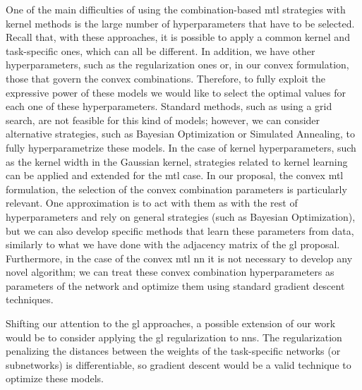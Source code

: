One of the main difficulties of using the combination-based \acrshort{mtl} strategies with kernel methods is the large number of hyperparameters that have to be selected. Recall that, with these approaches, it is possible to apply a common kernel and task-specific ones, which can all be different. In addition, we have other hyperparameters, such as the regularization ones or, in our convex formulation, those that govern the convex combinations. 
%
Therefore, to fully exploit the expressive power of these models we would like to select the optimal values for each one of these hyperparameters. Standard methods, such as using a grid search, are not feasible for this kind of models; however, we can consider alternative strategies, such as Bayesian Optimization or Simulated Annealing, to fully hyperparametrize these models.
In the case of kernel hyperparameters, such as the kernel width in the Gaussian kernel, strategies related to kernel learning can be applied and extended for the \acrshort{mtl} case. 
In our proposal, the convex \acrshort{mtl} formulation, the selection of the convex combination parameters is particularly relevant. One approximation is to act with them as with the rest of hyperparameters and rely on general strategies (such as Bayesian Optimization), but we can also develop specific methods that learn these parameters from data, similarly to what we have done with the adjacency matrix of the \acrshort{gl} proposal.
Furthermore, in the case of the convex \acrshort{mtl} \acrshort{nn} it is not necessary to develop any novel algorithm; we can treat these convex combination hyperparameters as parameters of the network and optimize them using standard gradient descent techniques.

Shifting our attention to the \acrshort{gl} approaches, a possible extension of our work would be to consider applying the \acrshort{gl} regularization to \acrshort{nns}.
The regularization penalizing the distances between the weights of the task-specific networks (or subnetworks) is differentiable, so gradient descent would be a valid technique to optimize these models.



